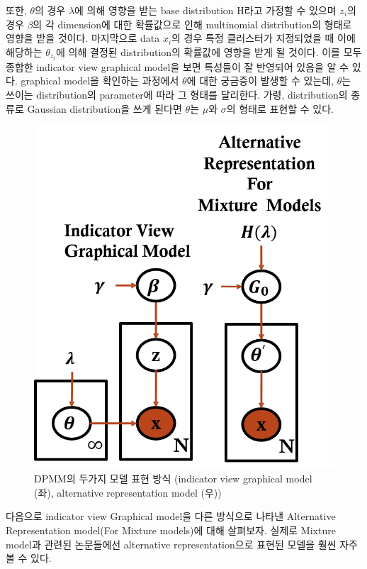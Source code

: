 \documentclass[a4paper]{oblivoir}
\begin{document}
또한, $\theta$의 경우 $\lambda$에 의해 영향을 받는 base distribution H라고 가정할 수 있으며 $z_{i}$의 경우 $\beta$의 각 dimension에 대한 확률값으로 인해 multinomial distribution의 형태로 영향을 받을 것이다. 마지막으로 data $x_{i}$의 경우 특정 클러스터가 지정되었을 때 이에 해당하는 $\theta_{z_{i}}$에 의해 결정된 distribution의 확률값에 영향을 받게 될 것이다. 이를 모두 종합한  indicator view graphical model을 보면 특성들이 잘 반영되어 있음을 알 수 있다. graphical model을 확인하는 과정에서 $\theta$에 대한 궁금증이 발생할 수 있는데, $\theta$는 쓰이는 distribution의 parameter에 따라 그 형태를 달리한다. 가령, distribution의 종류로 Gaussian distribution을 쓰게 된다면 $\theta$는 $\mu$와 $\sigma$의 형태로 표현할 수 있다.
\begin{figure}[ht] \centering 
\begin{center}
\includegraphics[scale=0.6]{fig13_8.png} 
\caption{DPMM의 두가지 모델 표현 방식 (indicator view graphical model (좌), alternative representation model (우))}
\label{fig:13-8}
\end{center}
\end{figure}

다음으로 indicator view Graphical model을 다른 방식으로 나타낸 Alternative Representation model(For Mixture models)에 대해 살펴보자. 실제로 Mixture model과 관련된 논문들에선 alternative representation으로 표현된 모델을 훨씬 자주 볼 수 있다.
\end{document}
